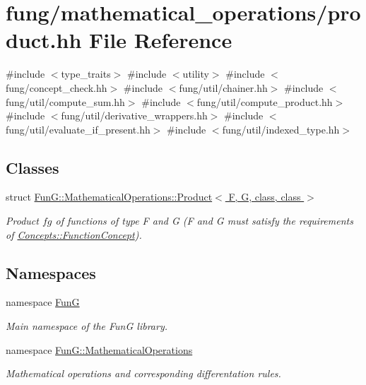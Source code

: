 \hypertarget{product_8hh}{\section{fung/mathematical\-\_\-operations/product.hh \-File \-Reference}
\label{product_8hh}
}
{\ttfamily \#include $<$type\-\_\-traits$>$}\*
{\ttfamily \#include $<$utility$>$}\*
{\ttfamily \#include $<$fung/concept\-\_\-check.\-hh$>$}\*
{\ttfamily \#include $<$fung/util/chainer.\-hh$>$}\*
{\ttfamily \#include $<$fung/util/compute\-\_\-sum.\-hh$>$}\*
{\ttfamily \#include $<$fung/util/compute\-\_\-product.\-hh$>$}\*
{\ttfamily \#include $<$fung/util/derivative\-\_\-wrappers.\-hh$>$}\*
{\ttfamily \#include $<$fung/util/evaluate\-\_\-if\-\_\-present.\-hh$>$}\*
{\ttfamily \#include $<$fung/util/indexed\-\_\-type.\-hh$>$}\*
\subsection*{\-Classes}
\begin{DoxyCompactItemize}
\item 
struct \hyperlink{structFunG_1_1MathematicalOperations_1_1Product}{\-Fun\-G\-::\-Mathematical\-Operations\-::\-Product$<$ F, G, class, class $>$}
\begin{DoxyCompactList}\small\item\em \-Product $fg$ of functions of type \-F and \-G (\-F and \-G must satisfy the requirements of \hyperlink{structFunG_1_1Concepts_1_1FunctionConcept}{\-Concepts\-::\-Function\-Concept}). \end{DoxyCompactList}\end{DoxyCompactItemize}
\subsection*{\-Namespaces}
\begin{DoxyCompactItemize}
\item 
namespace \hyperlink{namespaceFunG}{\-Fun\-G}
\begin{DoxyCompactList}\small\item\em \-Main namespace of the \-Fun\-G library. \end{DoxyCompactList}\item 
namespace \hyperlink{namespaceFunG_1_1MathematicalOperations}{\-Fun\-G\-::\-Mathematical\-Operations}
\begin{DoxyCompactList}\small\item\em \-Mathematical operations and corresponding differentation rules. \end{DoxyCompactList}\end{DoxyCompactItemize}
